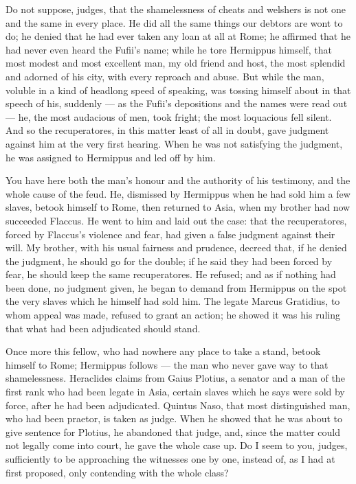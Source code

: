  Do not suppose, judges, that the shamelessness of cheats and welshers is not one and the same in every place. He did all the same things our debtors are wont to do; he denied that he had ever taken any loan at all at Rome; he affirmed that he had never even heard the Fufii's name; while he tore Hermippus himself, that most modest and most excellent man, my old friend and host, the most splendid and adorned of his city, with every reproach and abuse. But while the man, voluble in a kind of headlong speed of speaking, was tossing himself about in that speech of his, suddenly --- as the Fufii's depositions and the names were read out --- he, the most audacious of men, took fright; the most loquacious fell silent. And so the recuperatores, in this matter least of all in doubt, gave judgment against him at the very first hearing. When he was not satisfying the judgment, he was assigned to Hermippus and led off by him.

 You have here both the man's honour and the authority of his testimony, and the whole cause of the feud. He, dismissed by Hermippus when he had sold him a few slaves, betook himself to Rome, then returned to Asia, when my brother had now succeeded Flaccus. He went to him and laid out the case: that the recuperatores, forced by Flaccus's violence and fear, had given a false judgment against their will. My brother, with his usual fairness and prudence, decreed that, if he denied the judgment, he should go for the double; if he said they had been forced by fear, he should keep the same recuperatores. He refused; and as if nothing had been done, no judgment given, he began to demand from Hermippus on the spot the very slaves which he himself had sold him. The legate Marcus Gratidius, to whom appeal was made, refused to grant an action; he showed it was his ruling that what had been adjudicated should stand.

 Once more this fellow, who had nowhere any place to take a stand, betook himself to Rome; Hermippus follows --- the man who never gave way to that shamelessness. Heraclides claims from Gaius Plotius, a senator and a man of the first rank who had been legate in Asia, certain slaves which he says were sold by force, after he had been adjudicated. Quintus Naso, that most distinguished man, who had been praetor, is taken as judge. When he showed that he was about to give sentence for Plotius, he abandoned that judge, and, since the matter could not legally come into court, he gave the whole case up. Do I seem to you, judges, sufficiently to be approaching the witnesses one by one, instead of, as I had at first proposed, only contending with the whole class?

